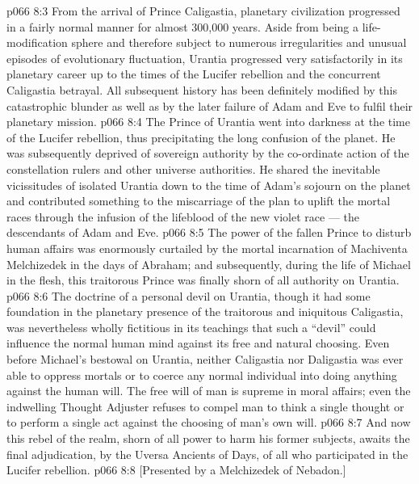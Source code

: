 \vs p066 8:3 \pc From the arrival of Prince Caligastia, planetary civilization progressed in a fairly normal manner for almost 300,000 years. Aside from being a life\hyp{}modification sphere and therefore subject to numerous irregularities and unusual episodes of evolutionary fluctuation, Urantia progressed very satisfactorily in its planetary career up to the times of the Lucifer rebellion and the concurrent Caligastia betrayal. All subsequent history has been definitely modified by this catastrophic blunder as well as by the later failure of Adam and Eve to fulfil their planetary mission.
\vs p066 8:4 The Prince of Urantia went into darkness at the time of the Lucifer rebellion, thus precipitating the long confusion of the planet. He was subsequently deprived of sovereign authority by the co\hyp{}ordinate action of the constellation rulers and other universe authorities. He shared the inevitable vicissitudes of isolated Urantia down to the time of Adam’s sojourn on the planet and contributed something to the miscarriage of the plan to uplift the mortal races through the infusion of the lifeblood of the new violet race --- the descendants of Adam and Eve.
\vs p066 8:5 The power of the fallen Prince to disturb human affairs was enormously curtailed by the mortal incarnation of Machiventa Melchizedek in the days of Abraham; and subsequently, during the life of Michael in the flesh, this traitorous Prince was finally shorn of all authority on Urantia.
\vs p066 8:6 \pc The doctrine of a personal devil on Urantia, though it had some foundation in the planetary presence of the traitorous and iniquitous Caligastia, was nevertheless wholly fictitious in its teachings that such a “devil” could influence the normal human mind against its free and natural choosing. Even before Michael’s bestowal on Urantia, neither Caligastia nor Daligastia was ever able to oppress mortals or to coerce any normal individual into doing anything against the human will. The free will of man is supreme in moral affairs; even the indwelling Thought Adjuster refuses to compel man to think a single thought or to perform a single act against the choosing of man’s own will.
\vs p066 8:7 And now this rebel of the realm, shorn of all power to harm his former subjects, awaits the final adjudication, by the Uversa Ancients of Days, of all who participated in the Lucifer rebellion.
\vsetoff
\vs p066 8:8 [Presented by a Melchizedek of Nebadon.]
